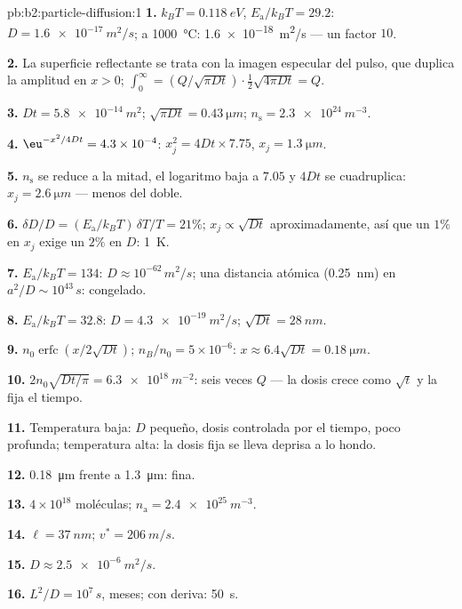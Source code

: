 \begin{solution}{pb:b2:particle-diffusion:1}
\textbf{1.} $k_BT = \qty{0.118}{eV}$, $E_{\text{a}}/k_BT = 29.2$: $D =
\qty{1.6e-17}{m^2/s}$; a \qty{1000}{\celsius}: \qty{1.6e-18}{m^2/s} --- un
factor $10$.

\textbf{2.} La superficie reflectante se trata con la imagen especular del
pulso, que duplica la amplitud en $x > 0$; $\int_0^\infty = (Q/\sqrt{\pi Dt})
\cdot \tfrac12\sqrt{4\pi Dt} = Q$.

\textbf{3.} $Dt = \qty{5.8e-14}{m^2}$; $\sqrt{\pi Dt} = \qty{0.43}{\micro m}$; $n_{\text{s}}
= \qty{2.3e24}{m^{-3}}$.

\textbf{4.} $\eu^{-x^2/4Dt} = 4.3 \times 10^{-4}$: $x_j^2 = 4Dt \times 7.75$, $x_j =
\qty{1.3}{\micro m}$.

\textbf{5.} $n_{\text{s}}$ se reduce a la mitad, el logaritmo baja a $7.05$ y $4Dt$
se cuadruplica: $x_j = \qty{2.6}{\micro m}$ --- menos del doble.

\textbf{6.} $\delta D/D = (E_{\text{a}}/k_BT)\,\delta T/T = 21\%$; $x_j \propto
\sqrt{Dt}$ aproximadamente, así que un $1\%$ en $x_j$ exige un $2\%$ en $D$: \qty{1}{K}.

\textbf{7.} $E_{\text{a}}/k_BT = 134$: $D \approx 10^{-62}\,\unit{m^2/s}$; una
distancia atómica (\qty{0.25}{nm}) en $a^2/D \sim 10^{43}\,\unit{s}$: congelado.

\textbf{8.} $E_{\text{a}}/k_BT = 32.8$: $D = \qty{4.3e-19}{m^2/s}$; $\sqrt{Dt} =
\qty{28}{nm}$.

\textbf{9.} $n_0\operatorname{erfc}(x/2\sqrt{Dt})$; $n_B/n_0 = 5 \times 10^{-6}$:
$x \approx 6.4\sqrt{Dt} = \qty{0.18}{\micro m}$.

\textbf{10.} $2n_0\sqrt{Dt/\pi} = \qty{6.3e18}{m^{-2}}$: seis veces $Q$ ---
la dosis crece como $\sqrt t$ y la fija el tiempo.

\textbf{11.} Temperatura baja: $D$ pequeño, dosis controlada por el tiempo,
poco profunda; temperatura alta: la dosis fija se lleva deprisa a lo hondo.

\textbf{12.} \qty{0.18}{\micro m} frente a \qty{1.3}{\micro m}: fina.

\textbf{13.} $4 \times 10^{18}$ moléculas; $n_{\text{a}} = \qty{2.4e25}{m^{-3}}$.

\textbf{14.} $\ell = \qty{37}{nm}$; $v^* = \qty{206}{m/s}$.

\textbf{15.} $D \approx \qty{2.5e-6}{m^2/s}$.

\textbf{16.} $L^2/D = 10^7\,\unit{s}$, meses; con deriva: \qty{50}{s}.


\end{solution}
